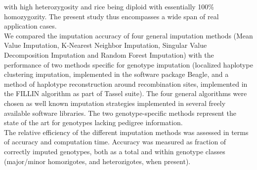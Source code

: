 with high heterozygosity and rice being diploid with essentially 100\% homozygozity.
The present study thus encompasses a wide span of real application cases.\\
We compared the imputation accuracy of four general imputation methods (Mean
Value Imputation, K-Nearest Neighbor Imputation, Singular Value Decomposition
Imputation and Random Forest Imputation) with the performance of two methods specific 
for genotype imputation (localized haplotype clustering imputation, 
implemented in the software package Beagle, and a method of haplotype
reconstruction around recombination sites, implemented in the FILLIN algorithm
as part of Tassel suite). The four general algorithms were chosen as well known 
imputation strategies implemented in several freely available software libraries.
The two genotype-specific methods represent the state of the art 
for genotypes lacking pedigree information.\\
The relative efficiency of the different imputation methods was assessed in terms of 
accuracy and computation time. Accuracy was measured as fraction of 
correctly imputed genotypes, both as a total and within genotype classes 
(major/minor homozigotes, and heterozigotes, when present).

